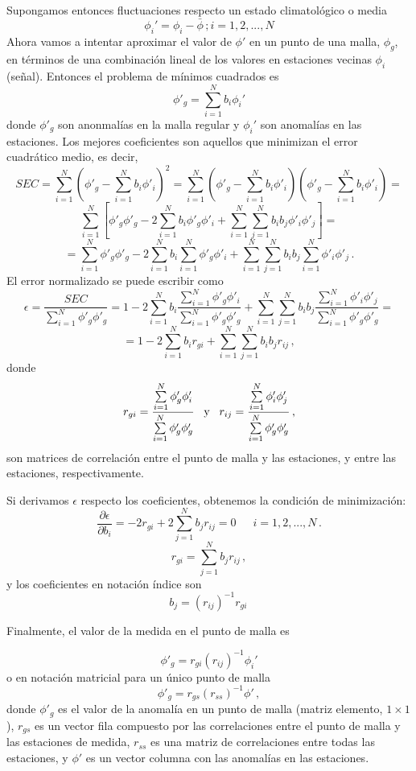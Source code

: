 \documentclass[
]{agujournal2019}
\begin{document}
Supongamos entonces fluctuaciones respecto un estado climatológico o
media \[\phi_i'=\phi_i-\bar{\phi}\,; i=1,2,...,N\] Ahora vamos a
intentar aproximar el valor de \(\phi'\) en un punto de una malla,
\(\phi_g\), en términos de una combinación lineal de los valores en
estaciones vecinas \(\phi_i\) (señal). Entonces el problema de mínimos
cuadrados es \[\phi'_g=\sum\limits^N_{i=1}b_i\phi_i'\] donde \(\phi'_g\)
son anonmalías en la malla regular y \(\phi_i'\) son anomalías en las
estaciones. Los mejores coeficientes son aquellos que minimizan el error
cuadrático medio, es decir,
\[SEC=\sum\limits^N_{i=1}\left(\phi'_g-\sum\limits_{i=1}^N b_i\phi'_i \right)^2
     =\sum\limits^N_{i=1}\left(\phi'_g-\sum\limits_{i=1}^N b_i\phi'_i \right)\left(\phi'_g-\sum\limits_{i=1}^N b_i\phi'_i \right)=\]
\[\sum\limits^N_{i=1}\left[\phi'_g \phi'_g -2\sum\limits_{i=1}^N b_i\phi'_g\phi'_i
      +\sum\limits^N_{i=1}\sum\limits^N_{j=1} b_i b_j \phi'_i \phi'_j \right]=\]
\[=\sum\limits^N_{i=1}\phi'_g \phi'_g -2 \sum\limits^N_{i=1} b_i \sum\limits^N_{i=1} \phi'_g\phi'_i + \sum\limits^N_{i=1}\sum\limits^N_{j=1}
b_i b_j \sum\limits^N_{i=1} \phi'_i \phi'_j\,.\] El error normalizado se
puede escribir como
\[\epsilon=\frac{SEC}{\sum\limits^N_{i=1}\phi'_g \phi'_g}=1-2 \sum\limits^N_{i=1} b_i \frac{\sum\limits^N_{i=1} \phi'_g\phi'_i}{\sum\limits^N_{i=1}\phi'_g \phi'_g} + \sum\limits^N_{i=1}\sum\limits^N_{j=1} b_i b_j \frac{\sum\limits^N_{i=1} \phi'_i \phi'_j}{\sum\limits^N_{i=1}\phi'_g \phi'_g}=\]
\[=1-2 \sum\limits^N_{i=1} b_i r_{gi} + \sum\limits^N_{i=1}\sum\limits^N_{j=1} b_i b_j r_{ij}\,,\]
donde
\[r_{gi}=\frac{\sum\limits^N_{i=1} \phi'_g\phi'_i}{\sum\limits^N_{i=1}\phi'_g \phi'_g}\,\,\,\,\,{\rm y}\,\,\,\,\,r_{ij}=\frac{\sum\limits^N_{i=1} \phi'_i \phi'_j}{\sum\limits^N_{i=1}\phi'_g \phi'_g}\,,\]
son matrices de correlación entre el punto de malla y las estaciones, y
entre las estaciones, respectivamente.

Si derivamos \(\epsilon\) respecto los coeficientes, obtenemos la
condición de minimización:
\[\frac{\partial{\epsilon}}{\partial{b_i}}=-2 r_{gi} + 2\sum\limits^N_{j=1}b_j r_{ij}=0\,\,\,\,\,\,\,\,\,i=1,2,...,N\,.\]
\[r_{gi}=\sum\limits^N_{j=1}b_j r_{ij}\,,\] y los coeficientes en
notación índice son \[b_j=(r_{ij})^{-1}r_{gi}\,\]

Finalmente, el valor de la medida en el punto de malla es

\[\phi'_g=r_{gi}(r_{ij})^{-1}\phi_i'\] o en notación matricial para un
único punto de malla \[\phi'_g=r_{gs}(r_{ss})^{-1}\phi'\,,\] donde
\(\phi'_g\) es el valor de la anomalía en un punto de malla (matriz
elemento, \(1\times 1\)), \(r_{gs}\) es un vector fila compuesto por las
correlaciones entre el punto de malla y las estaciones de medida,
\(r_{ss}\) es una matriz de correlaciones entre todas las estaciones, y
\(\phi'\) es un vector columna con las anomalías en las estaciones.
\end{document}
